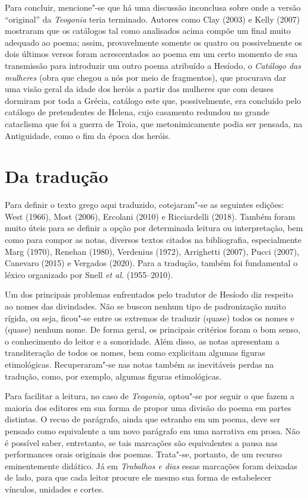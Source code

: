 Para concluir, mencione"-se que há uma discussão inconclusa sobre onde a
versão ``original'' da \emph{Teogonia} teria terminado. Autores como
Clay (2003) e Kelly (2007) mostraram que os catálogos tal como
analisados acima compõe um final muito adequado ao poema; assim,
provavelmente somente os quatro ou possivelmente os dois últimos versos
foram acrescentados ao poema em um certo momento de sua transmissão para
introduzir um outro poema atribuído a Hesíodo, o \emph{Catálogo das
mulheres} (obra que chegou a nós por meio de fragmentos), que procurava
dar uma visão geral da idade dos heróis a partir das mulheres que com
deuses dormiram por toda a Grécia, catálogo este que, possivelmente, era
concluído pelo catálogo de pretendentes de Helena, cujo casamento
redundou no grande cataclisma que foi a guerra de Troia, que
metonimicamente podia ser pensada, na Antiguidade, como o fim da época
dos heróis.

\section*{Da tradução}

Para definir o texto grego aqui traduzido, cotejaram"-se as seguintes
edições: West (1966), Most (2006), Ercolani (2010) e Ricciardelli (2018). Também foram
muito úteis para se definir a opção por determinada leitura ou
interpretação, bem como para compor as notas, diversos textos citados na
bibliografia, especialmente Marg (1970), Renehan (1980), Verdenius (1972), Arrighetti
(2007), Pucci (2007), Canevaro (2015) e Vergados (2020). Para a tradução, também foi
fundamental o léxico organizado por Snell \emph{et al.} (1955--2010).

Um dos principais problemas enfrentados pelo tradutor de Hesíodo
diz respeito ao nomes das divindades. Não se buscou
nenhum tipo de padronização muito rígida, ou seja, ficou"-se entre os
extremos de traduzir (quase) todos os nomes e (quase) nenhum nome. De
forma geral, os principais critérios foram o bom senso, o conhecimento
do leitor e a sonoridade. Além disso, as notas apresentam a
transliteração de todos os nomes, bem como explicitam algumas figuras
etimológicas. Recuperaram"-se nas notas também as inevitáveis perdas na tradução, como, por exemplo, algumas figuras etimológicas.

Para facilitar a leitura, no caso de \textit{Teogonia},
optou"-se por seguir o que fazem a maioria dos
editores em sua forma de propor uma divisão do poema em partes
distintas. O recuo de parágrafo, ainda que estranho em um poema, deve
ser pensado como equivalente a um novo parágrafo em uma narrativa em
prosa. Não é possível saber, entretanto, se tais marcações são
equivalentes a pausa nas performances orais originais dos poemas.
Trata"-se, portanto, de um recurso eminentemente didático.
Já em \textit{Trabalhos e dias} essas marcações foram deixadas de lado,
para que cada leitor procure ele mesmo sua forma de estabelecer vínculos, unidades e cortes.


